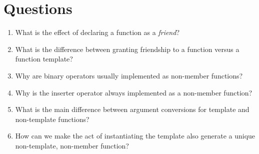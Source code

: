 \section{Questions}

\begin{enumerate}
\item
  What is the effect of declaring a function as a \emph{friend}?
\item
  What is the difference between granting friendship to a function versus a function template?
\item
  Why are binary operators usually implemented as non-member functions?
\item
  Why is the inserter operator always implemented as a non-member function?
\item
  What is the main difference between argument conversions for template and non-template functions?
\item
  How can we make the act of instantiating the template also generate a unique non-template, non-member function?
\end{enumerate}

